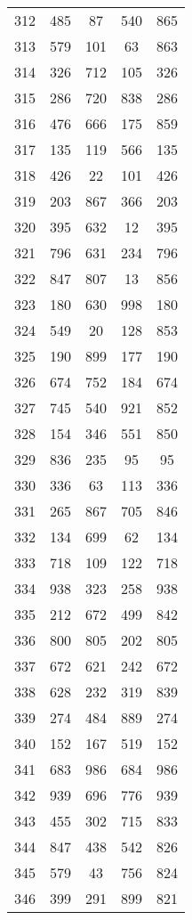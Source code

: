 \documentclass[a4paper,10pt,ngerman]{scrartcl}
\begin{document}
\begin{longtable}[c]{c|c|c|c|c}
    312 & 485 & 87 & 540 & 865 \\
    313 & 579 & 101 & 63 & 863 \\
    314 & 326 & 712 & 105 & 326 \\
    315 & 286 & 720 & 838 & 286 \\
    316 & 476 & 666 & 175 & 859 \\
    317 & 135 & 119 & 566 & 135 \\
    318 & 426 & 22 & 101 & 426 \\
    319 & 203 & 867 & 366 & 203 \\
    320 & 395 & 632 & 12 & 395 \\
    321 & 796 & 631 & 234 & 796 \\
    322 & 847 & 807 & 13 & 856 \\
    323 & 180 & 630 & 998 & 180 \\
    324 & 549 & 20 & 128 & 853 \\
    325 & 190 & 899 & 177 & 190 \\
    326 & 674 & 752 & 184 & 674 \\
    327 & 745 & 540 & 921 & 852 \\
    328 & 154 & 346 & 551 & 850 \\
    329 & 836 & 235 & 95 & 95 \\
    330 & 336 & 63 & 113 & 336 \\
    331 & 265 & 867 & 705 & 846 \\
    332 & 134 & 699 & 62 & 134 \\
    333 & 718 & 109 & 122 & 718 \\
    334 & 938 & 323 & 258 & 938 \\
    335 & 212 & 672 & 499 & 842 \\
    336 & 800 & 805 & 202 & 805 \\
    337 & 672 & 621 & 242 & 672 \\
    338 & 628 & 232 & 319 & 839 \\
    339 & 274 & 484 & 889 & 274 \\
    340 & 152 & 167 & 519 & 152 \\
    341 & 683 & 986 & 684 & 986 \\
    342 & 939 & 696 & 776 & 939 \\
    343 & 455 & 302 & 715 & 833 \\
    344 & 847 & 438 & 542 & 826 \\
    345 & 579 & 43 & 756 & 824 \\
    346 & 399 & 291 & 899 & 821 \\

\end{longtable}
\end{document}
